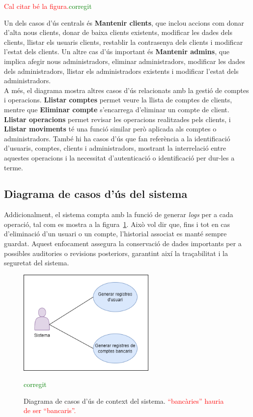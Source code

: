 \documentclass[a4paper,12pt,twoside]{ThesisStyle}
\newcommand{\pau}[1]{\textcolor{red}{#1}}
\newcommand{\sudan}[1]{\textcolor{green}{#1}}
\begin{document}
\pau{Cal citar bé la figura.}\sudan{corregit}


 Un dels casos d'ús centrals és \textbf{Mantenir clients}, que inclou accions com donar d'alta nous clients, donar de baixa clients existents, modificar les dades dels clients, llistar els usuaris clients, restablir la contrasenya dels clients i modificar l'estat dels clients. Un altre cas d'ús important és \textbf{Mantenir admins}, que implica afegir nous administradors, eliminar administradors, modificar les dades dels administradors, llistar els administradors existents i modificar l'estat dels administradors.\\

A més, el diagrama mostra altres casos d'ús relacionats amb la gestió de comptes i operacions. \textbf{Llistar comptes} permet veure la llista de comptes de clients, mentre que \textbf{Eliminar compte} s'encarrega d'eliminar un compte de client. \textbf{Llistar operacions} permet revisar les operacions realitzades pels clients, i \textbf{Llistar moviments} té una funció similar però aplicada als comptes o administradors. També hi ha casos d'ús que fan referència a la identificació d'usuaris, comptes, clients i administradors, mostrant la interrelació entre aquestes operacions i la necessitat d'autenticació o identificació per dur-les a terme.

\subsection{Diagrama de casos d'ús del sistema}
\label{subsec: Diagrama de casos d'ús del sistema}

Addicionalment, el sistema compta amb la funció de generar \textit{logs} per a cada operació, tal com es mostra a la figura~\ref{fig:Diagrama de Casos d'Ús de Context del sistema}. Això vol dir que, fins i tot en cas d'eliminació d'un usuari o un compte, l'historial associat es manté sempre guardat. Aquest enfocament assegura la conservació de dades importants per a possibles auditories o revisions posteriors, garantint així la traçabilitat i la seguretat del sistema.


\begin{figure}[h]
    \centering
    \includegraphics[width=0.6\textwidth]{imatges/logs.png}
    \caption{Diagrama de casos d'ús de context del sistema. \pau{``bancàries'' hauria de ser ``bancaris''.}}\sudan{corregit}
    \label{fig:Diagrama de Casos d'Ús de Context del sistema}
\end{figure}
\end{document}
